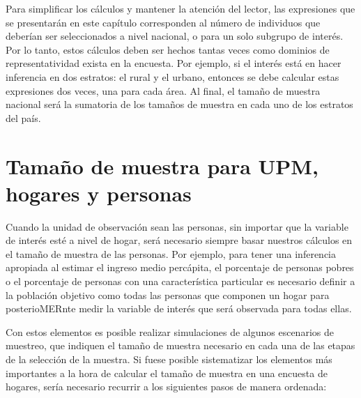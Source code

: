 \documentclass[
  12pt,
  spanish,
]{book}
\begin{document}
Para simplificar los cálculos y mantener la atención del lector, las expresiones que se presentarán en este capítulo corresponden al número de individuos que deberían ser seleccionados a nivel nacional, o para un solo subgrupo de interés. Por lo tanto, estos cálculos deben ser hechos tantas veces como dominios de representatividad exista en la encuesta. Por ejemplo, si el interés está en hacer inferencia en dos estratos: el rural y el urbano, entonces se debe calcular estas expresiones dos veces, una para cada área. Al final, el tamaño de muestra nacional será la sumatoria de los tamaños de muestra en cada uno de los estratos del país.

\hypertarget{tamauxf1o-de-muestra-para-upm-hogares-y-personas}{%
\section{Tamaño de muestra para UPM, hogares y personas}\label{tamauxf1o-de-muestra-para-upm-hogares-y-personas}}

Cuando la unidad de observación sean las personas, sin importar que la variable de interés esté a nivel de hogar, será necesario siempre basar nuestros cálculos en el tamaño de muestra de las personas. Por ejemplo, para tener una inferencia apropiada al estimar el ingreso medio percápita, el porcentaje de personas pobres o el porcentaje de personas con una característica particular es necesario definir a la población objetivo como todas las personas que componen un hogar para posterioMERnte medir la variable de interés que será observada para todas ellas.

Con estos elementos es posible realizar simulaciones de algunos escenarios de muestreo, que indiquen el tamaño de muestra necesario en cada una de las etapas de la selección de la muestra. Si fuese posible sistematizar los elementos más importantes a la hora de calcular el tamaño de muestra en una encuesta de hogares, sería necesario recurrir a los siguientes pasos de manera ordenada:
\end{document}

